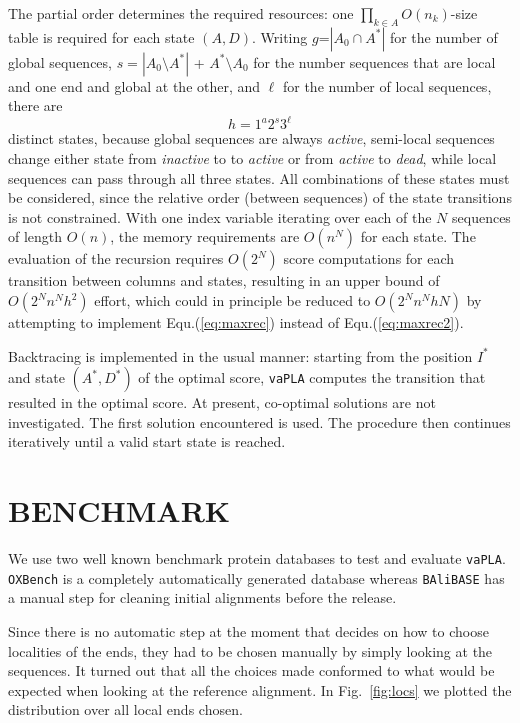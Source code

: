 \documentclass[a4paper,10pt]{article}
\let\cite\citep
\newcommand{\TODO}[1]{\begingroup\color{red}#1\endgroup}
\newcommand{\NR}[1]{\begingroup\color{orange}#1\endgroup}
\newcommand{\SAFTWARE}{\texttt{vaPLA}} %
\begin{document}
The partial order determines the required resources: one
$\prod_{k\in A} O(n_k)$-size table is required for each state $(A,D)$.
Writing $g$=$|A_0\cap A^*|$ for the number of global sequences,
$s=|A_0\setminus A^*|$ + $A^*\setminus A_0$ for the number sequences that
are local and one end and global at the other, and $\ell$ for the number of
local sequences, there are
\begin{equation}
  h = 1^a 2^s 3^{\ell} 
\end{equation} 
distinct states, because global sequences are always \textit{active},
semi-local sequences change either state from \textit{inactive} to to
\textit{active} or from \textit{active} to \textit{dead}, while local
sequences can pass through all three states. All combinations of these
states must be considered, since the relative order (between sequences) of
the state transitions is not constrained. With one index variable
  iterating over each of the $N$ sequences of length $O(n)$, the memory
  requirements are $O(n^N)$ for each state.  The evaluation of the
  recursion requires $O(2^N)$ score computations for each transition
  between columns and states, resulting in an upper bound of
  $O(2^N n^N h^2)$ effort, which could in principle be reduced to
  $O(2^N n^N h N)$ by attempting to implement Equ.(\ref{eq:maxrec})
  instead of Equ.(\ref{eq:maxrec2}).

Backtracing is implemented in the usual manner: starting from the
  position $I^*$ and state $(A^*,D^*)$ of the optimal score, \SAFTWARE{}
  computes the transition that resulted in the optimal score. At present,
  co-optimal solutions are not investigated. The first solution encountered
  is used. The procedure then continues iteratively until a valid start state
  is reached.

\section{\uppercase{Benchmark}}

We use two well known benchmark protein databases to test and evaluate
\SAFTWARE. \texttt{OXBench} \cite{oxbench} is a completely automatically
generated database whereas \texttt{BAliBASE} \cite{balibase} has a manual
step for cleaning initial alignments before the release.

\NR{Since there is no automatic step at the moment that decides on how to 
choose localities of the ends, they had to be chosen manually by simply looking
at the sequences. It turned out that all the choices made conformed to what 
would be expected when looking at the reference alignment. In Fig.~\ref{fig:locs}
we plotted the distribution over all local ends chosen.}
\end{document}
